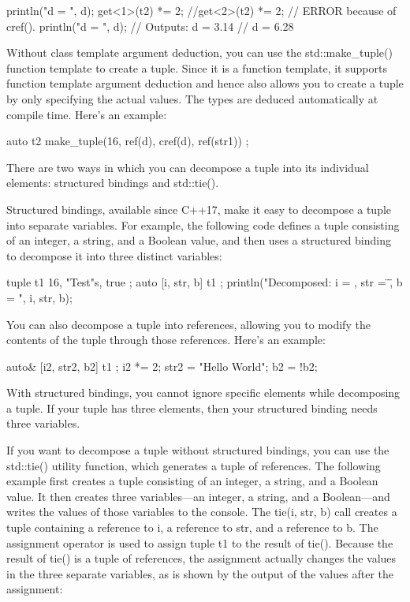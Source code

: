 \begin{cpp}
println("d = {}", d);
get<1>(t2) *= 2;
//get<2>(t2) *= 2; // ERROR because of cref().
println("d = {}", d);
// Outputs: d = 3.14
// d = 6.28
\end{cpp}

Without class template argument deduction, you can use the std::make\_tuple() function template to create a tuple. Since it is a function template, it supports function template argument deduction and hence also allows you to create a tuple by only specifying the actual values. The types are deduced automatically at compile time. Here’s an example:

\begin{cpp}
auto t2 { make_tuple(16, ref(d), cref(d), ref(str1)) };
\end{cpp}


There are two ways in which you can decompose a tuple into its individual elements: structured bindings and std::tie().


Structured bindings, available since C++17, make it easy to decompose a tuple into separate variables. For example, the following code defines a tuple consisting of an integer, a string, and a Boolean value, and then uses a structured binding to decompose it into three distinct variables:

\begin{cpp}
tuple t1 { 16, "Test"s, true };
auto [i, str, b] { t1 };
println("Decomposed: i = {}, str = \"{}\", b = {}", i, str, b);
\end{cpp}

You can also decompose a tuple into references, allowing you to modify the contents of the tuple through those references. Here’s an example:

\begin{cpp}
auto& [i2, str2, b2] { t1 };
i2 *= 2;
str2 = "Hello World";
b2 = !b2;
\end{cpp}

With structured bindings, you cannot ignore specific elements while decomposing a tuple. If your tuple has three elements, then your structured binding needs three variables.


If you want to decompose a tuple without structured bindings, you can use the std::tie() utility function, which generates a tuple of references. The following example first creates a tuple consisting of an integer, a string, and a Boolean value. It then creates three variables—an integer, a string, and a Boolean—and writes the values of those variables to the console. The tie(i, str, b) call creates a tuple containing a reference to i, a reference to str, and a reference to b. The assignment operator is used to assign tuple t1 to the result of tie(). Because the result of tie() is a tuple of references, the assignment actually changes the values in the three separate variables, as is shown by the output of the values after the assignment:

